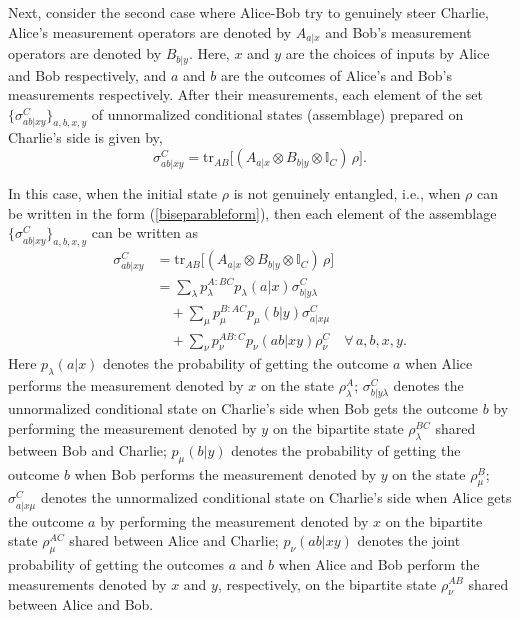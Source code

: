 \documentclass[pra,a4paper,aps,twocolumn,showpacs,superscriptaddress,groupedaddress]{revtex4}
\begin{document}
 Next, consider the second case where Alice-Bob try to genuinely steer Charlie, Alice's  measurement operators are denoted by $A_{a|x}$ and Bob's measurement operators are denoted by $B_{b|y}$. Here, $x$ and $y$ are the choices of inputs by Alice and Bob respectively, and $a$ and $b$ are the outcomes of Alice's and Bob's measurements respectively. After their measurements,  each element of the set $\{\sigma_{ab|xy}^{C}\}_{a,b,x,y}$ of unnormalized conditional states (assemblage) prepared on Charlie's side is given by,
 \begin{equation}
	\sigma_{ab|xy}^{C}= \text{tr}_{AB} \big[(A_{a|x} \otimes B_{b|y} \otimes \mathbb{I}_C) \, \rho \big].
\label{assemblage2}
\end{equation}

In this case, when the initial state $\rho$ is not genuinely entangled, i.e., when $\rho$ can be written in the form (\ref{biseparableform}),  then each element of the assemblage $\{\sigma_{ab|xy}^{C}\}_{a,b,x,y}$  can be written as
\begin{align}
	\sigma_{ab|xy}^{C} &= \text{tr}_{AB} \big[(A_{a|x} \otimes B_{b|y} \otimes \mathbb{I}_C) \, \rho \big] \nonumber \\
				&= \sum_{\lambda} p_{\lambda}^{A:BC} p_{\lambda}(a|x) \sigma_{b|y\lambda}^{C} \nonumber \\
				& \quad + \sum_{\mu}p_{\mu}^{B:AC} p_{\mu}(b|y)  \sigma_{a|x\mu}^C \nonumber \\
				&\quad + \sum_{\nu}p_{\nu}^{AB:C} p_{\nu}(ab|xy) \rho_{\nu}^{C} \quad \forall \, a,b,x,y. 
				\label{ass2}
\end{align}
Here $p_{\lambda}(a|x)$ denotes the probability of getting the outcome $a$ when Alice performs the measurement denoted by $x$ on the state $\rho_{\lambda}^A$; $\sigma_{b|y\lambda}^{C}$ denotes the unnormalized conditional state on Charlie's side when Bob gets the outcome $b$ by performing the measurement denoted by $y$ on the bipartite state $\rho_{\lambda}^{BC}$ shared between Bob and Charlie; $p_{\mu}(b|y)$ denotes the probability of getting the outcome $b$ when Bob performs the measurement denoted by $y$ on the state $\rho_{\mu}^B$; $\sigma_{a|x\mu}^C$  denotes the unnormalized conditional state on Charlie's side when Alice gets the outcome $a$ by performing the measurement denoted by $x$ on the bipartite state $\rho_{\mu}^{AC}$ shared between Alice and Charlie; $p_{\nu}(ab|xy)$ denotes the joint probability of getting the outcomes $a$ and $b$ when Alice and Bob perform the measurements denoted by $x$ and $y$, respectively, on the bipartite state $\rho_{\nu}^{AB}$ shared between Alice and Bob. 
\end{document}
